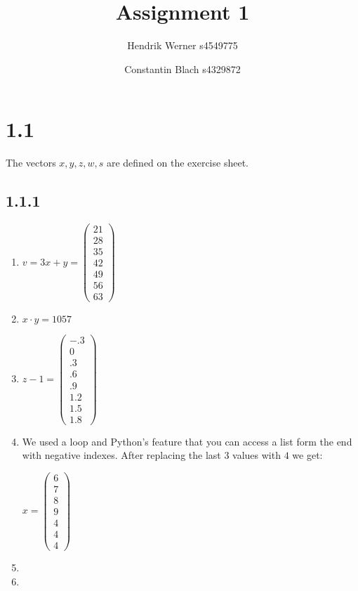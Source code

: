 \documentclass[12pt]{article}
\author{
	Hendrik Werner s4549775
	\and Constantin Blach s4329872
}
\title{Assignment 1}
\begin{document}
\maketitle

\section*{1.1}
The vectors $x, y, z, w, s$ are defined on the exercise sheet.

\subsection*{1.1.1}
\begin{enumerate}[a]
	\item %
	$v = 3x + y =
	\begin{pmatrix}
		21\\ 28\\ 35\\ 42\\ 49\\ 56\\ 63
	\end{pmatrix}$

	\item %
	$x \cdotp y = 1057$

	\item %
	$z - 1 =
	\begin{pmatrix}
		-.3\\ 0\\ .3\\ .6\\ .9\\ 1.2\\ 1.5\\ 1.8
	\end{pmatrix}$

	\item %
	We used a loop and Python's feature that you can access a list form the end with negative indexes. After replacing the last 3 values with $4$ we get:

	$x =
	\begin{pmatrix}
		6\\ 7\\ 8\\ 9\\ 4\\ 4\\ 4
	\end{pmatrix}$

	\item %
	\item %
\end{enumerate}
\end{document}
